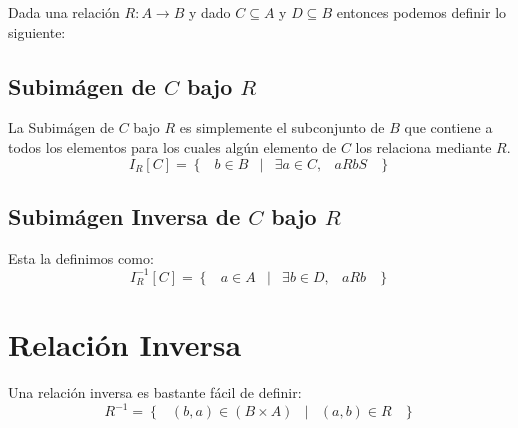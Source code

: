 \documentclass[12pt, fleqn]{report}                             %
\DeclareMathOperator \Space {\quad}                             %
\DeclareMathOperator \MiniSpace {\;}                            %
\newcommand \Such {\MiniSpace|\MiniSpace}                       %
\newcommand{\Set}[1]{\left\{ \MiniSpace #1 \MiniSpace \right\}} %
\begin{document}
            Dada una relación $R: A \to B$ y dado $C \subseteq A$ y $D \subseteq B$
            entonces podemos definir lo siguiente:

            \subsection*{Subimágen de $C$ bajo $R$}

                La Subimágen de $C$ bajo $R$ es simplemente el subconjunto de $B$ que contiene
                a todos los elementos para los cuales algún elemento de $C$ los relaciona
                mediante $R$.
                \begin{equation*}
                    I_R[C] = \Set{ b \in B \Such \exists a \in C, \MiniSpace aRb S}
                \end{equation*}


            \subsection*{Subimágen Inversa de $C$ bajo $R$}

                Esta la definimos como:
                \begin{equation*}
                    I_R^{-1}[C] = \Set{ a \in A \Such \exists b \in D, \MiniSpace aRb }
                \end{equation*}




        \clearpage
        \section{Relación Inversa}

            Una relación inversa es bastante fácil de definir:
            \begin{equation*}
                R^{-1} = \Set{ (b, a) \in (B \times A) \Such (a, b) \in R }
            \end{equation*}
\end{document}
